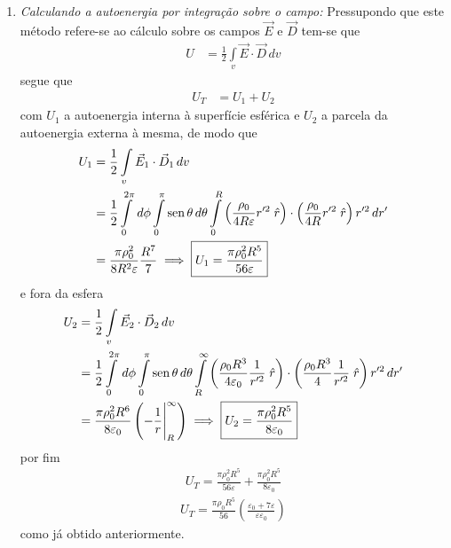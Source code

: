 \begin{prob}
\begin{sol}
\begin{enumerate}[label=\alph *)]
			\item \textit{Calculando a autoenergia por integração sobre o campo:}	
				Pressupondo que este método refere-se ao cálculo sobre os campos $\vec{E}$ e $\vec{D}$ tem-se que
				\begin{align}
					U &= \frac{1}{2}\int\limits_{v}\vec{E}\cdot \vec{D}\,d{v}
				\end{align}
				segue que
				\begin{align}
					U_{T} &= U_1 + U_2
				\end{align}
				com $U_{1}$ a autoenergia interna à superfície esférica e $U_{2}$ a parcela da autoenergia externa à mesma, de modo que
				\begin{align}
						\begin{split}
							U_{1} &= \frac{1}{2}\int\limits_{v}\vec{E}_{1}\cdot \vec{D}_{1}\,d{v}\\
										&= \frac{1}{2}\int\limits_{0}^{2 \pi}\,d{\phi}\int\limits_{0}^{\pi}\operatorname{sen} \theta\,d{\theta}\int\limits_{0}^{R}\left(\frac{\rho_0}{4R \varepsilon}r^{\prime 2}\; \hat{r}\right)\cdot\left(\frac{\rho_0}{4R}r^{\prime 2}\; \hat{r}\right)r^{\prime 2}\,d{r^{\prime}}\\
										&= \frac{\pi \rho_0^{2}}{8R^{2} \varepsilon}\frac{R^{7}}{7}\implies \boxed{U_1=\frac{\pi \rho_0^{2}R^{5}}{56 \varepsilon}}
						\end{split}
				\end{align}
				e fora da esfera
				\begin{align}
						\begin{split}
							U_{2} &= \frac{1}{2}\int\limits_{v}\vec{E}_{2}\cdot \vec{D}_{2}\,d{v}\\
										&= \frac{1}{2}\int\limits_{0}^{2 \pi}\,d{\phi}\int\limits_{0}^{\pi}\operatorname{sen} \theta\,d{\theta}\int\limits_{R}^{\infty}\left(\frac{\rho_0 R^{3}}{4 \varepsilon_0}\frac{1}{r^{\prime 2}}\; \hat{r}\right)\cdot\left(\frac{\rho_0 R^{3}}{4}\frac{1}{r^{\prime 2}}\; \hat{r}\right)r^{\prime 2}\,d{r^{\prime}}\\
										&= \frac{\pi\rho_0^{2} R^{6}}{8 \varepsilon_0}\left(-\frac{1}{r}\Bigg|_{R}^{\infty}\right)\implies \boxed{U_{2}=\frac{\pi \rho_0^{2}R^{5}}{8 \varepsilon_0}}
						\end{split}
				\end{align}
				por fim
				\begin{align*}
						U_{T}=\frac{\pi \rho_0^{2}R^{5}}{56 \varepsilon}+\frac{\pi \rho_0^{2}R^{5}}{8 \varepsilon_0}
				\end{align*}
				\begin{align}
						\boxed{
							U_{T}=\frac{\pi \rho_0 R^{5}}{56}\left(\frac{\varepsilon_0+7 \varepsilon}{\varepsilon \varepsilon_0}\right)
						}
				\end{align}
				como já obtido anteriormente.
		\end{enumerate}



	\end{sol}
\end{prob}
